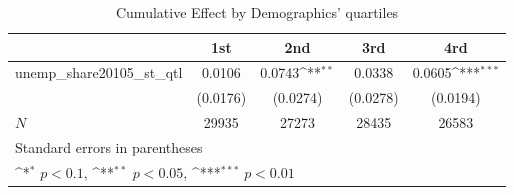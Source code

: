 \begin{table}[htbp]\centering
\def\sym#1{\ifmmode^{#1}\else\(^{#1}\)\fi}
\caption{Cumulative Effect by Demographics' quartiles}
\begin{tabular}{l*{4}{c}}
\hline\hline
            &\multicolumn{1}{c}{1st}&\multicolumn{1}{c}{2nd}&\multicolumn{1}{c}{3rd}&\multicolumn{1}{c}{4rd}\\
\hline
unemp\_share20105\_st\_qtl&      0.0106         &      0.0743\sym{**} &      0.0338         &      0.0605\sym{***}\\
            &    (0.0176)         &    (0.0274)         &    (0.0278)         &    (0.0194)         \\
\hline
\(N\)       &       29935         &       27273         &       28435         &       26583         \\
\hline\hline
\multicolumn{5}{l}{\footnotesize Standard errors in parentheses}\\
\multicolumn{5}{l}{\footnotesize \sym{*} \(p<0.1\), \sym{**} \(p<0.05\), \sym{***} \(p<0.01\)}\\
\end{tabular}
\end{table}
